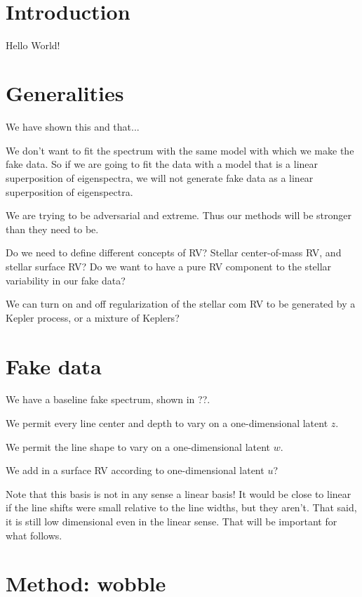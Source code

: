\documentclass[modern]{aastex63}
\begin{document}
\section*{~}
\clearpage
\section{Introduction}

Hello World!

\section{Generalities}

We have shown this and that...

We don't want to fit the spectrum with the same model with which we make the fake data.
So if we are going to fit the data with a model that is a linear superposition of eigenspectra,
we will not generate fake data as a linear superposition of eigenspectra.

We are trying to be adversarial and extreme.
Thus our methods will be stronger than they need to be.

Do we need to define different concepts of RV?
Stellar center-of-mass RV, and stellar surface RV?
Do we want to have a pure RV component to the stellar variability in our fake data?

We can turn on and off regularization of the stellar com RV to be generated by a Kepler process,
or a mixture of Keplers?

\section{Fake data}

We have a baseline fake spectrum, shown in ??.

We permit every line center and depth to vary on a one-dimensional latent $z$.

We permit the line shape to vary on a one-dimensional latent $w$.

We add in a surface RV according to one-dimensional latent $u$?

Note that this basis is not in any sense a linear basis!
It would be close to linear if the line shifts were small relative to the line widths,
but they aren't.
That said, it is still low dimensional even in the linear sense.
That will be important for what follows.

\section{Method: wobble}
\end{document}
